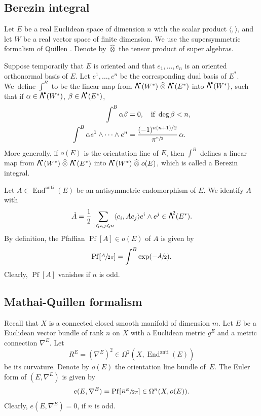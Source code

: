 \documentclass[JEP,XML,SOM,Unicode]{cedram}
\newcommand{\sbullet}{{\scriptscriptstyle\bullet}}
\newcommand\bw[1]{{\hbox{\large$\mathsf{\Lambda}$}^{\!#1}}}
\newcommand{\wotimes}{\mathrel{\widehat{\otimes}}}
\theoremstyle{plain}
\theoremstyle{definition}
\theoremstyle{remark}
\DeclareMathOperator{\End}{End}
\DeclareMathOperator{\Pf}{Pf}
\let\<\langle
\let\>\rangle
\let\l\leqslant
\begin{document}
\subsection{Berezin integral}\label{sec:Bere}
Let $E$ be a real Euclidean space of dimension $n$ with
the scalar product $\<,\>$, and let $W$ be a real vector space of
finite dimension. We use the supersymmetric formalism of Quillen
\cite{Quillensuper}. Denote by $\wotimes$ the tensor product of super algebras.

Suppose temporarily that $E$ is oriented and that $e_1,\ldots, e_n$
is an oriented orthonormal basis of $E$. Let $e^1,\ldots,e^n$ be the corresponding dual basis of $E^*$. We~define $\int^B$ to be the linear map from $\bw\sbullet(W^*)\wotimes\bw\sbullet(E^*)$ into $\bw\sbullet(W^*)$, such that if $\alpha\in \bw\sbullet(W^*)$, $\beta\in \bw\sbullet(E^*)$,
\begin{equation*}\label{eq:defBere}
\begin{split}
\int^B\alpha\beta&=0, \quad\text{if } \deg \beta<n,\\
\int^B\alpha
e^1\wedge\cdots\wedge e^n&=\frac{(-1)^{n(n+1)/2}}{\pi^{\sfrac{n}{2}}}\,\alpha.
\end{split}
\end{equation*}
More generally, if $o(E)$ is the orientation line of $E$, then $\int^B$ defines a linear map from $\bw\sbullet(W^*)\wotimes\bw\sbullet(E^*)$ into $\bw\sbullet(W^*)\wotimes o(E)$, which is called a Berezin integral.

Let $A\in \End^{\mathrm{anti}}(E)$ be an antisymmetric endomorphism of $E$. We identify $A$ with
\begin{equation}\label{eq:ALam}
\dot{A}=\frac{1}{2}\sum_{1\l i,j\l n}\<e_i,Ae_j\>e^i\wedge e^j\in \bw2(E^*).
\end{equation}
By definition, the Pfaffian $\Pf[A]\in o(E)$ of $A$ is given by
\begin{equation*}\label{eq:PfA}
\Pf[\sfrac{A}{2\pi}]=\int^B\exp(-\sfrac{\dot{A}}{2}).
\end{equation*}
Clearly, $\Pf[A]$ vanishes if $n$ is odd.

\subsection{Mathai-Quillen formalism}\label{sMQ}
Recall that $X$ is a connected closed smooth manifold of dimension $m$. Let
$E$ be a Euclidean vector bundle of rank $n$ on $X$ with a Euclidean
metric $g^{E}$ and a metric connection $\nabla^{E}$. Let
\[
R^{E}=(\nabla^{E})^{2}\in\Omega^{2}(X,\End^\mathrm{anti}(E))
\]
be its curvature. Denote by $o(E)$ the orientation line
bundle of~$E$.
The Euler form of
$(E,\nabla^{E})$ is given by
\begin{equation*}
e(E,\nabla^{E})=\Pf[\sfrac{R^{E}}{2\pi}] \in
\Omega^{n}(X,o(E)).
\end{equation*}
Clearly, $e(E,\nabla^{E})=0$, if $n$ is odd.
\end{document}
